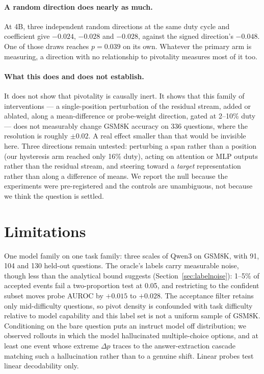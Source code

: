 \documentclass{article}
\newcommand{\pdelta}{\Delta p}
\begin{document}
\paragraph{A random direction does nearly as much.} At 4B, three
independent random directions at the same duty cycle and coefficient give
$-0.024$, $-0.028$ and $-0.028$, against the signed direction's $-0.048$.
One of those draws reaches $p{=}0.039$ on its own. Whatever the primary
arm is measuring, a direction with no relationship to pivotality measures
most of it too.

\paragraph{What this does and does not establish.} It does not show that
pivotality is causally inert. It shows that this family of interventions
--- a single-position perturbation of the residual stream, added or
ablated, along a mean-difference or probe-weight direction, gated at
2--10\% duty --- does not measurably change GSM8K accuracy on 336
questions, where the resolution is roughly $\pm 0.02$. A real effect
smaller than that would be invisible here. Three directions remain
untested: perturbing a span rather than a position (our hysteresis arm
reached only 16\% duty), acting on attention or MLP outputs rather than
the residual stream, and steering toward a \emph{target} representation
rather than along a difference of means. We report the null because the
experiments were pre-registered and the controls are unambiguous, not
because we think the question is settled.

\section{Limitations}
\label{sec:limitations}

One model family on one task family: three scales of Qwen3 on GSM8K, with
91, 104 and 130 held-out questions. The oracle's labels carry measurable
noise, though less than the analytical bound suggests
(Section~\ref{sec:labelnoise}): 1--5\% of accepted events fail a
two-proportion test at 0.05, and restricting to the confident subset moves
probe AUROC by $+0.015$ to $+0.028$. The
acceptance filter retains only mid-difficulty questions, so pivot density
is confounded with task difficulty relative to model capability and this
label set is not a uniform sample of GSM8K. Conditioning on the bare
question puts an instruct model off distribution; we observed rollouts in
which the model hallucinated multiple-choice options, and at least one
event whose extreme $\pdelta$ traces to the answer-extraction cascade
matching such a hallucination rather than to a genuine shift. Linear
probes test linear decodability only.
\end{document}
